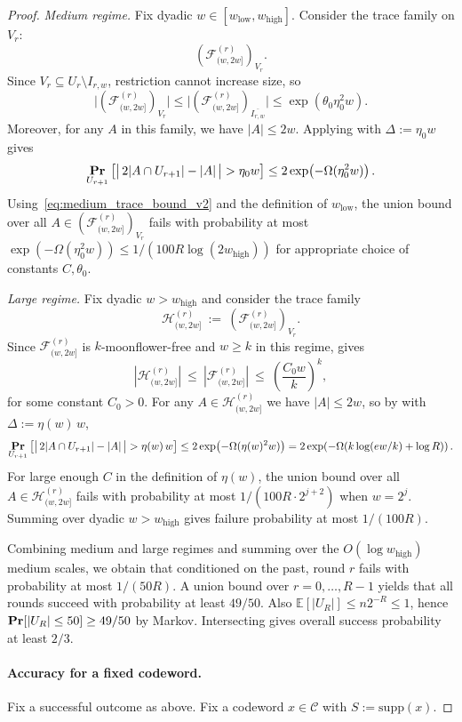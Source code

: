 \documentclass[10pt,a4paper]{amsart}
\DeclareMathOperator{\high}{\mathrm{high}}
\DeclareMathOperator{\low}{\mathrm{low}}
\newcommand{\E}{\mathbb{E}}
\newcommand{\calC}{\mathcal{C}}
\newcommand{\calF}{\mathcal{F}}
\newcommand{\calH}{\mathcal{H}}
\newcommand{\supp}{\mathrm{supp}}
\renewcommand{\Pr}{\mathop{\bf Pr\/}}
\begin{document}
\begin{proof}
\smallskip
\emph{Medium regime.}
Fix dyadic $w\in[w_{\low},w_{\high}]$. Consider the trace family on $V_r$:
\[
\left(\calF^{(r)}_{(w,2w]}\right)_{V_r}.
\]
Since $V_r\subseteq U_r\setminus I_{r,w}$, restriction cannot increase size, so
\[
\big|\left(\calF^{(r)}_{(w,2w]}\right)_{V_r}\big|
\le
\big|\left(\calF^{(r)}_{(w,2w]}\right)_{\overline{I_{r,w}}}\big| \leq \exp (\theta_0 \eta_0^2 w).
\]
Moreover, for any $A$ in this family, we have $|A|\le 2w$.
Applying  with $\Delta:=\eta_0 w$ gives 
\[
\Pr_{U_{r+1}}\left[\big|\,2|A\cap U_{r+1}|-|A|\,\big|>\eta_0 w\right]
\le
2\exp\!\left(-\Omega(\eta_0^2 w)\right).
\]
Using~\eqref{eq:medium_trace_bound_v2} and the definition of $w_{\low}$,
the union bound over all $A\in (\calF^{(r)}_{(w,2w]})_{V_r}$ fails with probability at most
$\exp(-\Omega(\eta_0^2 w))\le 1/(100R\log(2w_{\high}))$ for appropriate choice of constants $C, \theta_0$.

\smallskip
\emph{Large regime.}
Fix dyadic $w>w_{\high}$ and consider the trace family
\[
\calH^{(r)}_{(w,2w]}\ :=\ \left(\calF^{(r)}_{(w,2w]}\right)_{V_r}.
\]
Since $\calF^{(r)}_{(w,2w]}$ is $k$-moonflower-free and $w\ge k$ in this regime,
 gives 
\[
|\calH^{(r)}_{(w,2w]}|
\ \le\
|\calF^{(r)}_{(w,2w]}|
\ \le\
\left(\frac{C_0 w}{k}\right)^k,
\]
for some constant $C_0 > 0$.
For any $A\in\calH^{(r)}_{(w,2w]}$ we have $|A|\le 2w$, so by  with
$\Delta:=\eta(w)\,w$, 
\[
\Pr_{U_{r+1}}\left[\big|\,2|A\cap U_{r+1}|-|A|\,\big|>\eta(w)\,w\right]
\le
2\exp\!\left(-\Omega(\eta(w)^2 w)\right)
=
2\exp\!\left(-\Omega(k\log(e w/k)+\log R)\right).
\]
For large enough $C$ in the definition of $\eta(w)$, the union bound over all
$A\in\calH^{(r)}_{(w,2w]}$ fails with probability at most $1/(100R\cdot 2^{j+2})$
when $w=2^j$. Summing over dyadic $w>w_{\high}$ gives failure probability at most $1/(100R)$.

\smallskip
Combining medium and large regimes and summing over the $O(\log w_{\high})$ medium scales,
we obtain that conditioned on the past, round $r$ fails with probability at most $1/(50R)$.
A union bound over $r=0,\dots,R-1$ yields that all rounds succeed with probability at least $49/50$.
Also $\E[|U_R|]\le n2^{-R}\le 1$, hence $\Pr[|U_R|\le 50]\ge 49/50$ by Markov.
Intersecting gives overall success probability at least $2/3$.

\paragraph{Accuracy for a fixed codeword.}
Fix a successful outcome as above. Fix a codeword $x\in\calC$ with $S:=\supp(x)$.


\end{proof}
\end{document}
